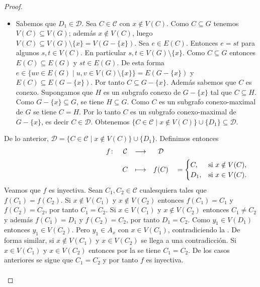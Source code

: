 \begin{proof}
\begin{itemize}
\begin{itemize}
         \end{itemize}
         En cualquier caso, $D\in \{C\in \mathcal{C}\mid x\notin V(C)\}\cup \{D_1\}$ y por tanto $\mathcal{D}\subseteq \{C\in \mathcal{C}\mid x\notin V(C)\}\cup \{D_1\}$.
      \item[$\supseteq$:] Sabemos que $D_1\in \mathcal{D}$. Sea $C\in\mathcal{C}$ con $x\notin V(C)$. Como $C\subseteq G$ tenemos $V(C)\subseteq V(G)$; además $x\notin V(C)$, luego $V(C)\subseteq V(G)\setminus \{x\}=V(G-\{x\})$. Sea $e\in E(C)$. Entonces $e=st$ para algunos $s,t\in V(C)$. En particular $s,t\in V(G)\setminus \{x\}$. Como $C\subseteq G$ entonces $E(C)\subseteq E(G)$ y $st\in E(G)$. De esta forma $e\in \{uv\in E(G)\mid u,v\in V(G)\setminus \{x\}\}=E(G-\{x\})$ y $E(C)\subseteq E(G-\{x\})$. Por tanto $C\subseteq G-\{x\}$. Además sabemos que $C$ es conexo. Supongamos que $H$ es un subgrafo conexo de $G-\{x\}$ tal que $C\subseteq H$. Como $G-\{x\}\subseteq G$, se tiene $H\subseteq G$. Como $C$ es un subgrafo conexo-maximal de $G$ se tiene $C=H$. Por lo tanto $C$ es un subgrafo conexo-maximal de $G-\{x\}$, es decir $C\in\mathcal{D}$. Obtenemos $\{C\in \mathcal{C}\mid x\notin V(C)\}\cup \{D_1\}\subseteq\mathcal{D}$.
   \end{itemize}
   De lo anterior, $\mathcal{D}=\{C\in \mathcal{C}\mid x\notin V(C)\}\cup \{D_1\}$. Definimos entonces
   \begin{equation*}
     \hspace*{6em}
     \begin{array}{r c c c l}
       f \colon
         & \mathcal{C} & \longrightarrow & \mathcal{D} & \\[0.5em]
       \hphantom{{}=\begin{cases} C, & \text{si } x \notin C, \\ C_1, & \text{si } x \in C. \end{cases}}
         & C & \longmapsto & f(C) &
       {}=\begin{cases}
         C,   & \text{si } x \notin V(C), \\
         D_1, & \text{si } x \in V(C).
       \end{cases}
     \end{array}
   \end{equation*}
   Veamos que $f$ es inyectiva. Sean $C_1,C_2\in\mathcal{C}$ cualesquiera tales que $f(C_1)=f(C_2)$. Si $x\notin V(C_1)$ y $x\notin V(C_2)$ entonces $f(C_1)=C_1$ y $f(C_2)=C_2$, por tanto $C_1=C_2$. Si $x\in V(C_1)$ y $x\notin V(C_2)$ entonces $C_1\ne C_2$ y además $f(C_1)=D_1$ y $f(C_2)=C_2$, por tanto $D_1=C_2$. Como $y_1\in V(D_1)$ entonces $y_1\in V(C_2)$. Pero $y_1\in A_x$ con $x\in V(C_1)$, contradiciendo la . De forma similar, si $x\notin V(C_1)$ y $x\in V(C_2)$ se llega a una contradicción. Si $x\in V(C_1)$ y $x\in V(C_2)$ entonces por la  se tiene $C_1=C_2$. De los casos anteriores se sigue que $C_1=C_2$ y por tanto $f$ es inyectiva.\\\\

\end{proof}
